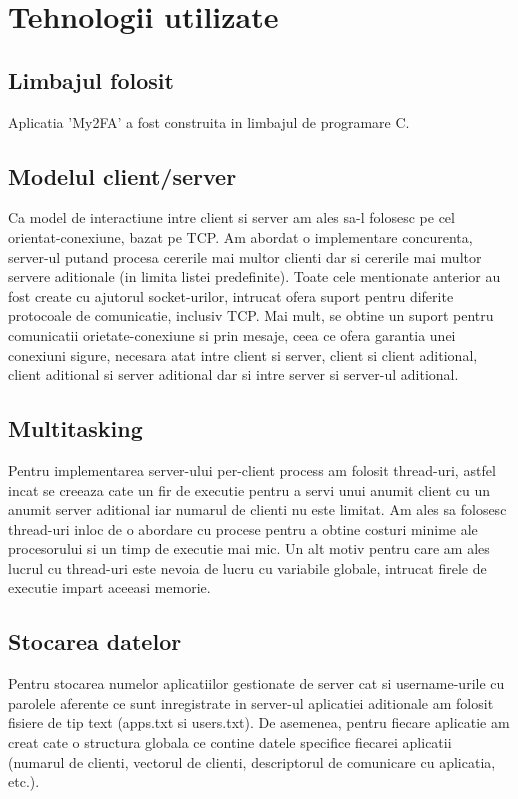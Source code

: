 \documentclass[runningheads]{llncs}
\begin{document}
\section{Tehnologii utilizate}
\subsection{Limbajul folosit}
\hspace{10pt} Aplicatia 'My2FA' a fost construita in limbajul de programare C.
\subsection{Modelul client/server}
\hspace{10pt} Ca model de interactiune intre client si server am ales sa-l folosesc pe cel orientat-conexiune, bazat pe TCP. Am abordat o implementare concurenta, server-ul putand procesa cererile mai multor clienti dar si cererile mai multor servere aditionale (in limita listei predefinite). Toate cele mentionate anterior au fost create cu ajutorul socket-urilor, intrucat ofera suport pentru diferite protocoale de comunicatie, inclusiv TCP. Mai mult, se obtine un suport pentru comunicatii orietate-conexiune si prin mesaje, ceea ce ofera garantia unei conexiuni sigure, necesara atat intre client si server, client si client aditional, client aditional si server aditional dar si intre server si server-ul aditional.
\subsection{Multitasking}
\hspace{10pt} Pentru implementarea server-ului per-client process am folosit thread-uri, astfel incat se creeaza cate un fir de executie pentru a servi unui anumit client cu un anumit server aditional iar numarul de clienti nu este limitat. Am ales sa folosesc thread-uri inloc de o abordare cu procese pentru a obtine costuri minime ale procesorului si un timp de executie mai mic. Un alt motiv pentru care am ales lucrul cu thread-uri este nevoia de lucru cu variabile globale, intrucat firele de executie impart aceeasi memorie.
\subsection{Stocarea datelor}
\hspace{10pt} Pentru stocarea numelor aplicatiilor gestionate de server cat si username-urile cu parolele aferente ce sunt inregistrate in server-ul aplicatiei aditionale am folosit fisiere de tip text (apps.txt si users.txt). De asemenea, pentru fiecare aplicatie am creat cate o structura globala ce contine datele specifice fiecarei aplicatii (numarul de clienti, vectorul de clienti, descriptorul de comunicare cu aplicatia, etc.).\\
\vspace{1cm}
	
\end{document}
